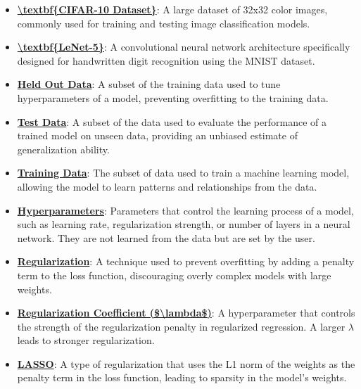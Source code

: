 \documentclass{article}%
\begin{document}
\begin{itemize}[leftmargin=*]
\item \href{https://www.math.purdue.edu/~yipn/351/09L1-cnn.pdf#page=23}{\textbf{\textbackslash{}textbf\{CIFAR{-}10 Dataset\}}}: A large dataset of 32x32 color images, commonly used for training and testing image classification models.%
\item \href{https://www.math.purdue.edu/~yipn/351/09L1-cnn.pdf#page=22}{\textbf{\textbackslash{}textbf\{LeNet{-}5\}}}: A convolutional neural network architecture specifically designed for handwritten digit recognition using the MNIST dataset.%
\end{itemize}%
\begin{itemize}[leftmargin=*]%
\item \href{https://www.math.purdue.edu/~yipn/351/10L1-CrossValidation.pdf#page=6}{\textbf{Held Out Data}}: A subset of the training data used to tune hyperparameters of a model, preventing overfitting to the training data.%
\item \href{https://www.math.purdue.edu/~yipn/351/10L1-CrossValidation.pdf#page=6}{\textbf{Test Data}}: A subset of the data used to evaluate the performance of a trained model on unseen data, providing an unbiased estimate of generalization ability.%
\item \href{https://www.math.purdue.edu/~yipn/351/10L1-CrossValidation.pdf#page=6}{\textbf{Training Data}}: The subset of data used to train a machine learning model, allowing the model to learn patterns and relationships from the data.%
\item \href{https://www.math.purdue.edu/~yipn/351/10L1-CrossValidation.pdf#page=14}{\textbf{Hyperparameters}}: Parameters that control the learning process of a model, such as learning rate, regularization strength, or number of layers in a neural network. They are not learned from the data but are set by the user.%
\item \href{https://www.math.purdue.edu/~yipn/351/10L1-CrossValidation.pdf#page=17}{\textbf{Regularization}}: A technique used to prevent overfitting by adding a penalty term to the loss function, discouraging overly complex models with large weights.%
\item \href{https://www.math.purdue.edu/~yipn/351/10L1-CrossValidation.pdf#page=17}{\textbf{Regularization Coefficient (\$\textbackslash{}lambda\$)}}: A hyperparameter that controls the strength of the regularization penalty in regularized regression. A larger $\lambda$ leads to stronger regularization.%
\item \href{https://www.math.purdue.edu/~yipn/351/10L1-CrossValidation.pdf#page=17}{\textbf{LASSO}}: A type of regularization that uses the L1 norm of the weights as the penalty term in the loss function, leading to sparsity in the model's weights.%

\end{itemize}
\end{document}
